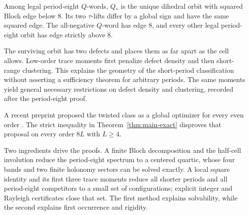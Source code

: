 \begin{theorem}
\label{thm:main-rigidity}
Among legal period-eight $Q$-words, $Q_*$ is the unique dihedral orbit with
squared Bloch edge below $8$.  Its two $\tau$-lifts differ by a global sign and
have the same squared edge.  The all-negative $Q$-word has edge $8$, and every
other legal period-eight orbit has edge strictly above $8$.
\end{theorem}

The surviving orbit has two defects and places them as far apart as the cell
allows.  Low-order trace moments first penalize defect density and then
short-range clustering.  This explains the geometry of the short-period
classification without asserting a sufficiency theorem for arbitrary periods.
The same moments yield general necessary restrictions on defect density and
clustering, recorded after the period-eight proof.

A recent preprint proposed the twisted class as a global optimizer for every
even order \cite{Suvagiya2026}.  The strict inequality in
Theorem~\ref{thm:main-exact} disproves that proposal on every order $8L$ with
$L\geq4$.

Two ingredients drive the proofs.  A finite Bloch decomposition and the
half-cell involution reduce the period-eight spectrum to a centered quartic,
whose four bands and two finite holonomy sectors can be solved exactly.  A
local square identity and its first three trace moments reduce all shorter
periods and all period-eight competitors to a small set of configurations;
explicit integer and Rayleigh certificates close that set.  The first method
explains solvability, while the second explains first occurrence and rigidity.
